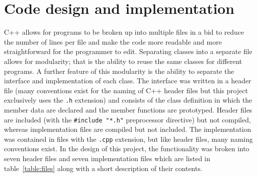 \section{Code design and implementation}
\label{sec:code}
C++ allows for programs to be broken up into multiple files in a bid to reduce the number of lines per file and make the code more readable and more straightforward for the programmer to edit. Separating classes into a separate file allows for modularity; that is the ability to reuse the same classes for different programs.
A further feature of this modularity is the ability to separate the interface and implementation of each class. The interface was  written in a header file (many conventions exist for the naming of C++ header files but this project exclusively uses the \verb!.h! extension) and consists of the class definition in which the member data are declared and the member functions are prototyped. Header files are included (with the \verb!#include "*.h"! preprocessor directive) but not compiled, whereas implementation files are compiled but not included. The implementation was contained in files with the \verb!.cpp! extension, but like header files, many naming conventions exist.
In the design of this project, the functionality was broken into seven header files and seven implementation files which are listed in table~\ref{table:files} along with a short description of their contents.

